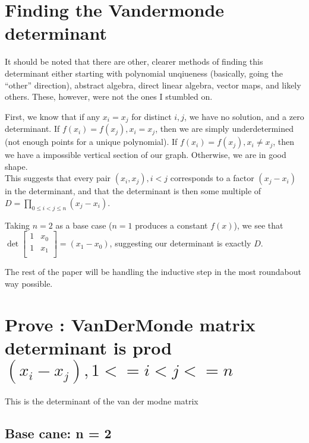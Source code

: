 \documentclass[11pt, oneside]{article} 	%
\begin{document}
\section{Finding the Vandermonde determinant}

It should be noted that there are other, clearer methods of finding this determinant\cite{1} either starting with polynomial unqiueness (basically, going the ``other'' direction), abstract algebra, direct linear algebra, vector maps, and likely others.  These, however, were not the ones I stumbled on.

First, we know that if any $x_i = x_j$ for distinct $i, j$, we have no solution, and a zero determinant. If $f(x_i) = f(x_j), x_i = x_j$, then we are simply underdetermined (not enough points for a unique polynomial).   If $f(x_i) = f(x_j), x_i \neq x_j$, then we have a impossible vertical section of our graph.  Otherwise, we are in good shape.  
\\

This suggests that every pair $(x_i, x_j), i < j$ corresponds to a factor  $(x_j - x_i)$ in the determinant, and that the determinant is then some multiple of $D = \prod_{0 \leq i < j \leq n}(x_j-x_i)$.

Taking $n=2$ as a base case ($n=1$ produces a constant $f(x)$), we see that 
 $\det\begin{bmatrix}
1 & x_0  \\
1 & x_1  \\
\end{bmatrix} = (x_1 - x_0)$, suggesting our determinant is exactly $D$.

The rest of the paper will be handling the inductive step in the most roundabout way possible.

\section{Prove : VanDerMonde matrix determinant is prod $(x_i - x_j), 1 <= i < j <= n$}
 This is the determinant of the van der modne matrix
\subsection{Base cane: n = 2}
\end{document}
